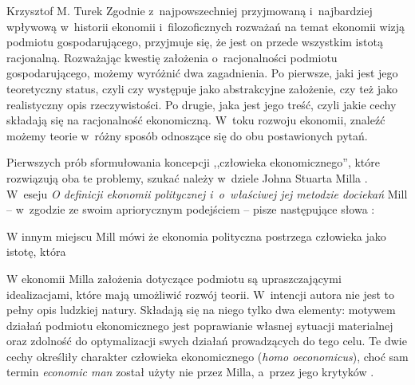 \begin{artplenv}{Krzysztof M. Turek}
Zgodnie z~najpowszechniej przyjmowaną i~najbardziej wpływową w~historii ekonomii i~filozoficznych rozważań na temat
ekonomii wizją podmiotu gospodarującego, przyjmuje się, że jest on przede wszystkim istotą racjonalną. Rozważając
kwestię założenia o~racjonalności podmiotu gospodarującego, możemy wyróżnić dwa zagadnienia. Po pierwsze, jaki jest
jego teoretyczny status, czyli czy występuje jako abstrakcyjne założenie, czy też jako realistyczny opis rzeczywistości.
Po drugie, jaka jest jego treść, czyli jakie cechy składają się na racjonalność ekonomiczną. W~toku rozwoju ekonomii,
znaleźć możemy teorie w~różny sposób odnoszące się do obu postawionych pytań.

Pierwszych prób sformułowania koncepcji ,,człowieka ekonomicznego'', które rozwiązują oba te problemy, szukać
należy w~dziele Johna Stuarta Milla
\parencite[s.~222]{persky_retrospectives:_1995}.
W~eseju \textit{O definicji ekonomii
politycznej i~o~właściwej jej metodzie dociekań} Mill -- w~zgodzie ze swoim apriorycznym podejściem -- pisze następujące
słowa
\parencite[s.~101]{mill_essays_2000}:

W innym miejscu Mill
\parencite[s.~97]{mill_essays_2000}
mówi że ekonomia polityczna postrzega człowieka jako
istotę, która


W ekonomii Milla założenia dotyczące podmiotu są upraszczającymi idealizacjami, które mają umożliwić rozwój
teorii. W~intencji autora nie jest to pełny opis ludzkiej natury. Składają się na niego tylko dwa elementy: motywem działań
podmiotu ekonomicznego jest poprawianie własnej sytuacji materialnej oraz zdolność do optymalizacji swych działań
prowadzących do tego celu. Te dwie cechy określiły charakter człowieka ekonomicznego (\textit{homo oeconomicus}), choć
sam termin \textit{economic man} został użyty nie przez Milla, a~przez jego krytyków
\parencite[s.~222]{persky_retrospectives:_1995}.


\end{artplenv}
